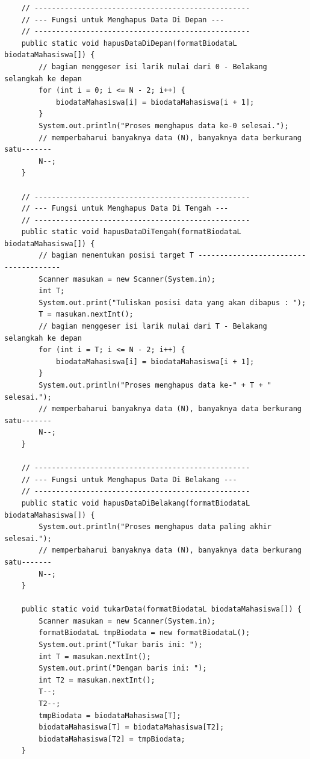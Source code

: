 \documentclass[a4paper,12pt]{article}
\begin{document}
\begin{lstlisting}
    // --------------------------------------------------
    // --- Fungsi untuk Menghapus Data Di Depan ---
    // --------------------------------------------------
    public static void hapusDataDiDepan(formatBiodataL biodataMahasiswa[]) {
        // bagian menggeser isi larik mulai dari 0 - Belakang selangkah ke depan
        for (int i = 0; i <= N - 2; i++) {
            biodataMahasiswa[i] = biodataMahasiswa[i + 1];
        }
        System.out.println("Proses menghapus data ke-0 selesai.");
        // memperbaharui banyaknya data (N), banyaknya data berkurang satu-------
        N--;
    }

    // --------------------------------------------------
    // --- Fungsi untuk Menghapus Data Di Tengah ---
    // --------------------------------------------------
    public static void hapusDataDiTengah(formatBiodataL biodataMahasiswa[]) {
        // bagian menentukan posisi target T --------------------------------------
        Scanner masukan = new Scanner(System.in);
        int T;
        System.out.print("Tuliskan posisi data yang akan dibapus : ");
        T = masukan.nextInt();
        // bagian menggeser isi larik mulai dari T - Belakang selangkah ke depan
        for (int i = T; i <= N - 2; i++) {
            biodataMahasiswa[i] = biodataMahasiswa[i + 1];
        }
        System.out.println("Proses menghapus data ke-" + T + " selesai.");
        // memperbaharui banyaknya data (N), banyaknya data berkurang satu-------
        N--;
    }

    // --------------------------------------------------
    // --- Fungsi untuk Menghapus Data Di Belakang ---
    // --------------------------------------------------
    public static void hapusDataDiBelakang(formatBiodataL biodataMahasiswa[]) {
        System.out.println("Proses menghapus data paling akhir selesai.");
        // memperbaharui banyaknya data (N), banyaknya data berkurang satu-------
        N--;
    }

    public static void tukarData(formatBiodataL biodataMahasiswa[]) {
        Scanner masukan = new Scanner(System.in);
        formatBiodataL tmpBiodata = new formatBiodataL();
        System.out.print("Tukar baris ini: ");
        int T = masukan.nextInt();
        System.out.print("Dengan baris ini: ");
        int T2 = masukan.nextInt();
        T--;
        T2--;
        tmpBiodata = biodataMahasiswa[T];
        biodataMahasiswa[T] = biodataMahasiswa[T2];
        biodataMahasiswa[T2] = tmpBiodata;
    }


\end{lstlisting}
\end{document}
